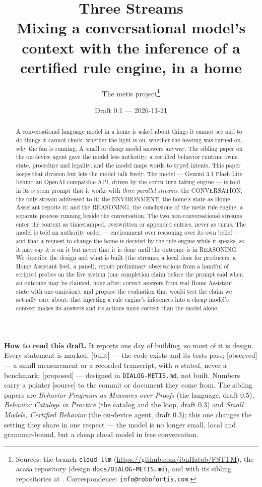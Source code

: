 \documentclass[11pt]{article}
\title{\textbf{Three Streams}\\[1ex]
\large Mixing a conversational model's context with the inference of a certified rule
engine, in a home}
\author{The metis project\thanks{Sources: the \fsttm{} branch \texttt{cloud-llm}
(\url{https://github.com/ibnHatab/FSTTM}), the acasa repository (design
\texttt{docs/DIALOG-METIS.md}), and \agent{} with its sibling repositories at \orgurl.
Correspondence: \texttt{info@robofortis.com}.}}
\date{Draft 0.1 --- 2026-11-21}
\newcommand{\fsttm}{\textsc{fsttm}}
\newcommand{\src}[1]{{\footnotesize\textsf{[#1]}}}
\newcommand{\built}{\textsf{\small[built]}}
\newcommand{\observed}{\textsf{\small[observed]}}
\newcommand{\proposed}{\textsf{\small[proposed]}}
\begin{document}
\maketitle

\begingroup\small\noindent
\textbf{How to read this draft.} It reports one day of building, so most of it is design.
Every statement is marked: \built{} --- the code exists and its tests pass;
\observed{} --- a small measurement or a recorded transcript, with $n$ stated, never a
benchmark; \proposed{} --- designed in \texttt{DIALOG-METIS.md}, not built. Numbers carry a
pointer \src{source} to the commit or document they come from. The sibling papers are
\emph{Behavior Programs as Measures over Proofs} (the language, draft 0.5),
\emph{Behavior Catalogs in Practice} (the catalog and the loop, draft 0.3) and
\emph{Small Models, Certified Behavior} (the on-device agent, draft 0.3); this one changes
the setting they share in one respect --- the model is no longer small, local and
grammar-bound, but a cheap cloud model in free conversation.
\endgroup

\begin{abstract}
A conversational language model in a home is asked about things it cannot see and to do
things it cannot check: whether the light is on, whether the heating was turned on, why the
fan is running. A small or cheap model answers anyway. The sibling paper on the on-device
agent gave the model less authority: a certified behavior runtime owns state, procedure and
legality, and the model maps words to typed intents. This paper keeps that division but lets
the model talk freely. The model --- Gemini 3.1 Flash-Lite behind an OpenAI-compatible API,
driven by the \fsttm{} turn-taking engine --- is told in its system prompt that it works with
\emph{three parallel streams}: the CONVERSATION, the only stream addressed to it; the
ENVIRONMENT, the home's state as Home Assistant reports it; and the REASONING, the
conclusions of the metis rule engine, a separate process running beside the conversation.
The two non-conversational streams enter the context as timestamped, overwritten or
appended entries, never as turns. The model is told an authority order --- environment over
reasoning over its own belief --- and that a request to change the home is decided by the
rule engine while it speaks, so it may say it is on it but never that it is done until the
outcome is in REASONING. We describe the design and what is built (the streams, a local door
for producers, a Home Assistant feed, a panel), report preliminary observations from a
handful of scripted probes on the live system (one completion claim before the prompt said
when an outcome may be claimed, none after; correct answers from real Home Assistant state
with one omission), and propose the evaluation that would test the claim we actually care
about: that injecting a rule engine's inferences into a cheap model's context makes its
answers and its actions more correct than the model alone.
\end{abstract}
\end{document}
